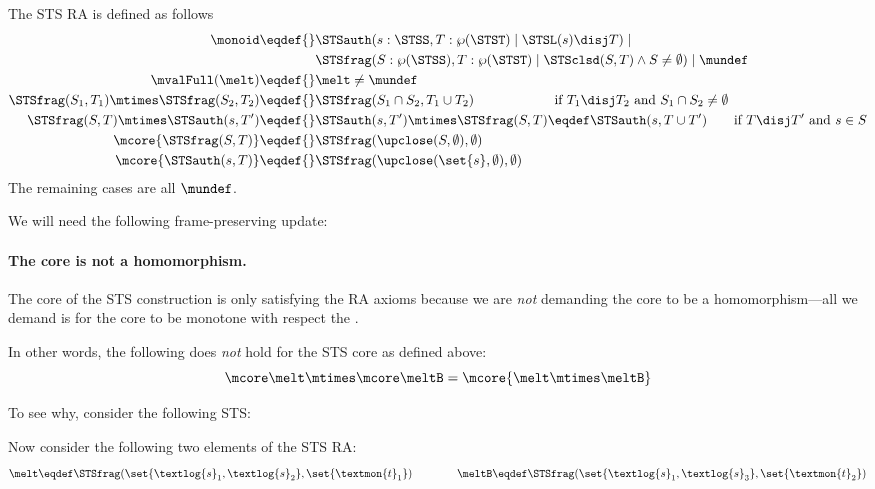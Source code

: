 The STS RA is defined as follows
\begin{align*}
  \monoid \eqdef{}& \STSauth(s:\STSS, T:\wp(\STST) \mid \STSL(s) \disj T) \mid{}\\& \STSfrag(S: \wp(\STSS), T: \wp(\STST) \mid \STSclsd(S, T) \land S \neq \emptyset) \mid \mundef \\
  \mvalFull(\melt) \eqdef{}& \melt \neq \mundef \\
  \STSfrag(S_1, T_1) \mtimes \STSfrag(S_2, T_2) \eqdef{}& \STSfrag(S_1 \cap S_2, T_1 \cup T_2) \qquad\qquad\qquad \text{if $T_1 \disj T_2$ and $S_1 \cap S_2 \neq \emptyset$} \\
  \STSfrag(S, T) \mtimes \STSauth(s, T') \eqdef{}& \STSauth(s, T') \mtimes \STSfrag(S, T) \eqdef \STSauth(s, T \cup T') \qquad \text{if $T \disj T'$ and $s \in S$} \\
  \mcore{\STSfrag(S, T)} \eqdef{}& \STSfrag(\upclose(S, \emptyset), \emptyset) \\
  \mcore{\STSauth(s, T)} \eqdef{}& \STSfrag(\upclose(\set{s}, \emptyset), \emptyset)
\end{align*}
The remaining cases are all $\mundef$.

We will need the following frame-preserving update:

\paragraph{The core is not a homomorphism.}
The core of the STS construction is only satisfying the RA axioms because we are \emph{not} demanding the core to be a homomorphism---all we demand is for the core to be monotone with respect the .

In other words, the following does \emph{not} hold for the STS core as defined above:
\[ \mcore\melt \mtimes \mcore\meltB = \mcore{\melt\mtimes\meltB} \]

To see why, consider the following STS:
\newcommand\st{\textlog{s}}
\newcommand\tok{\textmon{t}}
\begin{center}
\end{center}
Now consider the following two elements of the STS RA:
\[ \melt \eqdef \STSfrag(\set{\st_1,\st_2}, \set{\tok_1}) \qquad\qquad
  \meltB \eqdef \STSfrag(\set{\st_1,\st_3}, \set{\tok_2}) \]


